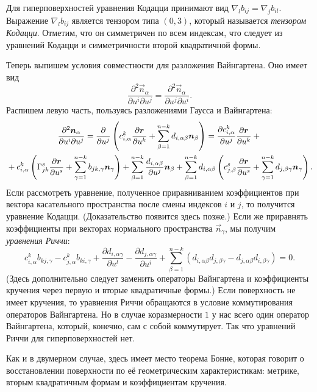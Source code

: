 Для гиперповерхностей уравнения Кодацци принимают вид $\nabla_lb_{ij} = \nabla_jb_{il}$. Выражение $\nabla_lb_{ij}$ является тензором типа $(0, 3)$, который называется \textit{тензором Кодацци}. Отметим, что он симметричен по всем индексам, что следует из уравнений Кодацци и симметричности второй квадратичной формы.

Теперь выпишем условия совместности для разложения Вайнгартена. Оно имеет вид
\[
	\frac{\partial^2\vec{n}_\alpha}{\partial u^i\partial u^j} = \frac{\partial^2\vec{n}_\alpha}{\partial u^j\partial u^i}.
\]
Распишем левую часть, пользуясь разложениями Гаусса и Вайнгартена:
\begin{multline*}
	\frac{\partial^2\boldsymbol{n}_\alpha}{\partial u^i\partial u^j} = \frac{\partial}{\partial u^j}\left(c_{i, \alpha}^k\frac{\partial\boldsymbol{r}}{\partial u^k} + \sum_{\beta = 1}^{n - k}d_{i, \alpha\beta}\boldsymbol{n}_\beta\right) = \frac{\partial c_{i, \alpha}^k}{\partial u^j}\frac{\partial\boldsymbol{r}}{\partial u^k} + {}\\{} + c_{i, \alpha}^k\left(\Gamma_{jk}^s\frac{\partial\boldsymbol{r}}{\partial u^s} + \sum_{\gamma = 1}^{n - k}b_{jk, \gamma}\boldsymbol{n}_\gamma\right) + \sum_{\beta = 1}^{n - k}\frac{d_{i, \alpha\beta}}{\partial u^j}\boldsymbol{n}_{\beta} + \sum_{\beta = 1}^{n - k}d_{i, \alpha\beta}\left(c_{j, \beta}^s\frac{\partial\boldsymbol{r}}{\partial u^s} + \sum_{\gamma = 1}^{n - k}d_{j, \beta\gamma}\boldsymbol{n}_\gamma\right).
\end{multline*}
Если рассмотреть уравнение, полученное приравниванием коэффициентов при вектора касательного пространства после смены индексов $i$ и $j$, то получится уравнение Кодацци. (Доказательство появится здесь позже.) Если же приравнять коэффициенты при векторах нормального пространства $\vec{n}_{\gamma}$, мы получим \textit{уравнения Риччи}:
\[
	c_{i, \alpha}^kb_{kj, \gamma} - c_{j, \alpha}^kb_{ki, \gamma} + \frac{\partial d_{i, \alpha\gamma}}{\partial u^l} - \frac{\partial d_{j, \alpha\gamma}}{\partial u^i} + \sum_{\beta = 1}^{n - k}(d_{i, \alpha\beta}d_{j, \beta\gamma} - d_{j, \alpha\beta}d_{i, \beta\gamma}) = 0.
\]
(Здесь дополнительно следует заменить операторы Вайнгартена и коэффициенты кручения через первую и вторые квадратичные формы.) Если поверхность не имеет кручения, то уравнения Риччи обращаются в условие коммутирования операторов Вайнгартена. Но в случае коразмерности $1$ у нас всего один оператор Вайнгартена, который, конечно, сам с собой коммутирует. Так что уравнений Риччи для гиперповерхностей нет.

Как и в двумерном случае, здесь имеет место теорема Бонне, которая говорит о восстановлении поверхности по её геометрическим характеристикам: метрике, вторым квадратичным формам и коэффициентам кручения.

